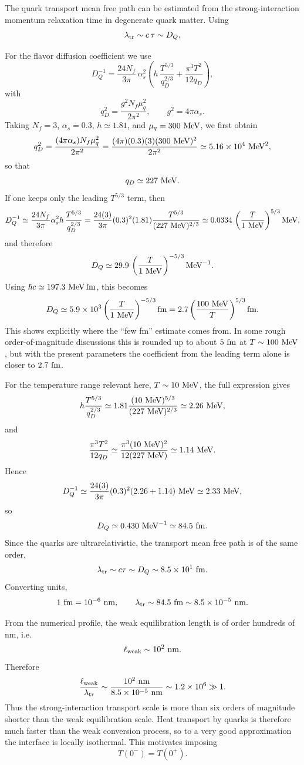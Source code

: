 \documentclass[11pt]{article}
\newcommand{\JS}[1]{{\color{violet}#1}}
\begin{document}
\JS{
The quark transport mean free path can be estimated from the strong-interaction momentum relaxation time in degenerate quark matter. Using
$$
\lambda_{\rm tr}\sim c\,\tau \sim D_Q ,
$$

For the flavor diffusion coefficient we use
$$
D_Q^{-1}
=
\frac{24N_f}{3\pi}\,\alpha_s^2
\left(
h\,\frac{T^{5/3}}{q_D^{2/3}}
+
\frac{\pi^3T^2}{12q_D}
\right),
$$
with
$$
q_D^2=\frac{g^2N_f\mu_q^2}{2\pi^2},
\qquad
g^2=4\pi\alpha_s.
$$
Taking $N_f=3$, $\alpha_s=0.3$, $h\simeq 1.81$, and $\mu_q=300~{\rm MeV}$, we first obtain
$$
q_D^2
=
\frac{(4\pi\alpha_s)N_f\mu_q^2}{2\pi^2}
=
\frac{(4\pi)(0.3)(3)(300~{\rm MeV})^2}{2\pi^2}
\simeq 5.16\times 10^4~{\rm MeV}^2,
$$
so that
$$
q_D\simeq 227~{\rm MeV}.
$$
If one keeps only the leading $T^{5/3}$ term, then
$$
D_Q^{-1}
\simeq
\frac{24N_f}{3\pi}\alpha_s^2
h\,\frac{T^{5/3}}{q_D^{2/3}}
=
\frac{24(3)}{3\pi}(0.3)^2(1.81)\frac{T^{5/3}}{(227~{\rm MeV})^{2/3}}
\simeq
0.0334\,
\left(\frac{T}{1~{\rm MeV}}\right)^{5/3}
{\rm MeV},
$$
and therefore
$$
D_Q
\simeq
29.9\,
\left(\frac{T}{1~{\rm MeV}}\right)^{-5/3}
{\rm MeV}^{-1}.
$$
Using $\hbar c\simeq 197.3~{\rm MeV\,fm}$, this becomes
$$
D_Q
\simeq
5.9\times 10^3
\left(\frac{T}{1~{\rm MeV}}\right)^{-5/3}
{\rm fm}
=
2.7
\left(\frac{100~{\rm MeV}}{T}\right)^{5/3}
{\rm fm}.
$$
This shows explicitly where the ``few fm'' estimate comes from. In some rough order-of-magnitude discussions this is rounded up to about $5~{\rm fm}$ at $T\sim 100~{\rm MeV}$, but with the present parameters the coefficient from the leading term alone is closer to $2.7~{\rm fm}$.

For the temperature range relevant here, $T\sim 10~{\rm MeV}$, the full expression gives
$$
h\frac{T^{5/3}}{q_D^{2/3}}
\simeq
1.81\frac{(10~{\rm MeV})^{5/3}}{(227~{\rm MeV})^{2/3}}
\simeq 2.26~{\rm MeV},
$$
and
$$
\frac{\pi^3T^2}{12q_D}
\simeq
\frac{\pi^3(10~{\rm MeV})^2}{12(227~{\rm MeV})}
\simeq 1.14~{\rm MeV}.
$$
Hence
$$
D_Q^{-1}
\simeq
\frac{24(3)}{3\pi}(0.3)^2(2.26+1.14)~{\rm MeV}
\simeq 2.33~{\rm MeV},
$$
so
$$
D_Q\simeq 0.430~{\rm MeV}^{-1}\simeq 84.5~{\rm fm}.
$$
Since the quarks are ultrarelativistic, the transport mean free path is of the same order,
$$
\lambda_{\rm tr}\sim c\tau\sim D_Q\sim 8.5\times 10^1~{\rm fm}.
$$
Converting units,
$$
1~{\rm fm}=10^{-6}~{\rm nm},
\qquad
\lambda_{\rm tr}\sim 84.5~{\rm fm}\sim 8.5\times 10^{-5}~{\rm nm}.
$$

From the numerical profile, the weak equilibration length is of order hundreds of nm, i.e.
$$
\ell_{\rm weak}\sim 10^2~{\rm nm}.
$$
Therefore
$$
\frac{\ell_{\rm weak}}{\lambda_{\rm tr}}
\sim
\frac{10^2~{\rm nm}}{8.5\times 10^{-5}~{\rm nm}}
\sim 1.2\times 10^6\gg 1.
$$
Thus the strong-interaction transport scale is more than six orders of magnitude shorter than the weak equilibration scale. Heat transport by quarks is therefore much faster than the weak conversion process, so to a very good approximation the interface is locally isothermal. This motivates imposing
$$
T(0^-)=T(0^+).
$$
}
\fi
\end{document}
